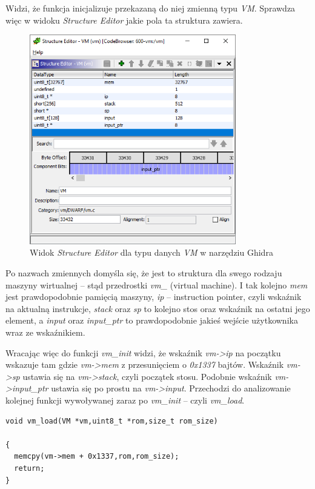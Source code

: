 \documentclass[language=polish,type=eng]{aghmodern}
\begin{document}
\begin{appendices}
Widzi, że funkcja inicjalizuje przekazaną do niej zmienną typu \emph{VM}.
Sprawdza więc w widoku \emph{Structure Editor} jakie pola ta struktura zawiera.

\begin{figure}[H]
\centering
\includegraphics[width=9cm]{600_struct}
\caption{Widok \emph{Structure Editor} dla typu danych \emph{VM} w narzędziu Ghidra}
\end{figure}

Po nazwach zmiennych domyśla się, że jest to struktura dla swego rodzaju maszyny wirtualnej
-- stąd przedrostki \emph{vm\_} (virtual machine). I tak kolejno \emph{mem} jest prawdopodobnie
pamięcią maszyny, \emph{ip} -- instruction pointer, czyli wskaźnik na aktualną instrukcje,
\emph{stack} oraz \emph{sp} to kolejno stos oraz wskaźnik na ostatni jego element, a \emph{input}
oraz \emph{input\_ptr} to prawdopodobnie jakieś wejście użytkownika wraz ze wskaźnikiem.

Wracając więc do funkcji \emph{vm\_init} widzi, że wskaźnik \emph{vm->ip} na początku wskazuje
tam gdzie \emph{vm->mem} z przesunięciem o \emph{0x1337} bajtów. Wskaźnik \emph{vm->sp} ustawia
się na \emph{vm->stack}, czyli początek stosu. Podobnie wskaźnik \emph{vm->input\_ptr} ustawia
się po prostu na \emph{vm->input}.
Przechodzi do analizowanie kolejnej funkcji wywoływanej zaraz po \emph{vm\_init} -- czyli
\emph{vm\_load}.

\begin{verbatim}
void vm_load(VM *vm,uint8_t *rom,size_t rom_size)

{
  memcpy(vm->mem + 0x1337,rom,rom_size);
  return;
}
\end{verbatim}


\end{appendices}
\end{document}
